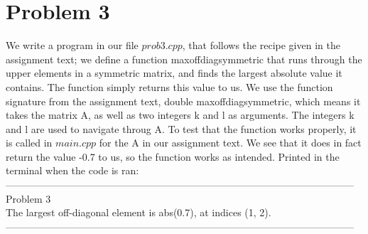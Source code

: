 \documentclass{article} %
\begin{document}
  \section{Problem 3} 
 We write a program in our file $prob3.cpp$, that follows the recipe given in the assignment text; we define a function maxoffdiagsymmetric
 that runs through the upper elements in a symmetric matrix, and finds the largest absolute value it contains. The function simply returns this value to us.
 We use the function signature from the assignment text, double maxoffdiagsymmetric, 
 which means it takes the matrix A, as well as two integers k and l as arguments. The integers k and l are used to navigate throug A. 
 To test that the function works properly, it is called in $main.cpp$ for the A in our assignment text. 
 We see that it does in fact return the value -0.7 to us, so the function works as intended. 
 Printed in the terminal when the code is ran:
 \\
 ---------------------------------------------------------------------------------------------------------
 Problem 3 \\
 The largest off-diagonal element is abs(0.7), at indices (1, 2). \\
 --------------------------------------------------------------------------------------------------------- \\
\end{document}
